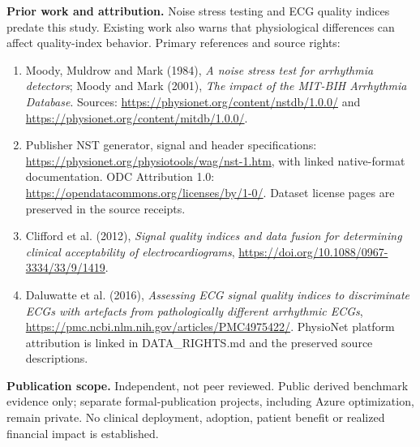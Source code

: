 \documentclass[10pt,letterpaper]{article}
\begin{document}
\textbf{Prior work and attribution.} Noise stress testing and ECG quality indices predate this study. Existing work also warns that physiological differences can affect quality-index behavior. Primary references and source rights:
\begin{enumerate}\setlength{\itemsep}{1pt}
\item Moody, Muldrow and Mark (1984), \textit{A noise stress test for arrhythmia detectors}; Moody and Mark (2001), \textit{The impact of the MIT-BIH Arrhythmia Database}. Sources: \url{https://physionet.org/content/nstdb/1.0.0/} and \url{https://physionet.org/content/mitdb/1.0.0/}.
\item Publisher NST generator, signal and header specifications: \url{https://physionet.org/physiotools/wag/nst-1.htm}, with linked native-format documentation. ODC Attribution 1.0: \url{https://opendatacommons.org/licenses/by/1-0/}. Dataset license pages are preserved in the source receipts.
\item Clifford et al. (2012), \textit{Signal quality indices and data fusion for determining clinical acceptability of electrocardiograms}, \url{https://doi.org/10.1088/0967-3334/33/9/1419}.
\item Daluwatte et al. (2016), \textit{Assessing ECG signal quality indices to discriminate ECGs with artefacts from pathologically different arrhythmic ECGs}, \url{https://pmc.ncbi.nlm.nih.gov/articles/PMC4975422/}. PhysioNet platform attribution is linked in DATA\_RIGHTS.md and the preserved source descriptions.
\end{enumerate}
\textbf{Publication scope.} Independent, not peer reviewed. Public derived benchmark evidence only; separate formal-publication projects, including Azure optimization, remain private. No clinical deployment, adoption, patient benefit or realized financial impact is established.
\end{document}
